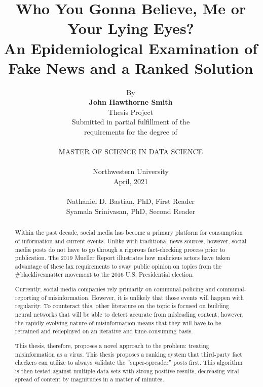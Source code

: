 \documentclass[preprint,review,12pt]{elsarticle}
\begin{document}
\begin{frontmatter}


\title{Who You Gonna Believe, Me or Your Lying Eyes?\\
An Epidemiological Examination of Fake News and a Ranked Solution}

\author{By \\\textbf{John Hawthorne Smith} \\Thesis Project \\Submitted in partial fulfillment of the \\requirements for the degree of \\ \\MASTER OF SCIENCE IN DATA SCIENCE \\ \\Northwestern University \\April, 2021 \\ \\Nathaniel D. Bastian, PhD, First Reader \\Syamala Srinivasan, PhD, Second Reader}




\begin{abstract}
Within the past decade, social media has become a primary platform for consumption of information and current events. Unlike with traditional news sources, however, social media posts do not have to go through a rigorous fact-checking process prior to publication. The 2019 Mueller Report illustrates how malicious actors have taken advantage of these lax requirements to sway public opinion on topics from the \#blacklivesmatter movement to the 2016 U.S. Presidential election. 

Currently, social media companies rely primarily on communal-policing and communal-reporting of misinformation. However, it is unlikely that those events will happen with regularity. To counteract this, other literature on the topic is focused on building neural networks that will be able to detect accurate from misleading content; however, the rapidly evolving nature of misinformation means that they will have to be retrained and redeployed on an iterative and time-consuming basis.

This thesis, therefore, proposes a novel approach to the problem: treating misinformation as a virus. This thesis proposes a ranking system that third-party fact checkers can utilize to always validate the ``super-spreader” posts first. This algorithm is then tested against multiple data sets with strong positive results, decreasing viral spread of content by magnitudes in a matter of minutes.


\end{abstract}
\end{frontmatter}
\end{document}

